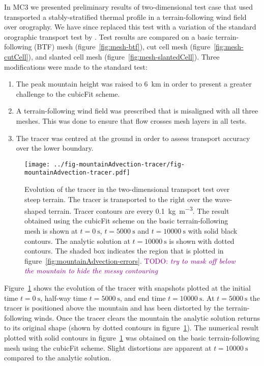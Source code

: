\documentclass[a4paper,11pt]{article}
\newcommand{\TODO}[1]{\textcolor{purple}{TODO: \emph{#1}}}
\begin{document}
In MC3 we presented preliminary results of two-dimensional test case that used transported a stably-stratified thermal profile in a terrain-following wind field over orography.  We have since replaced this test with a variation of the standard orographic transport test by \citet{schaer2002}.  Test results are compared on a basic terrain-following (BTF) mesh (figure~\ref{fig:mesh-btf}), cut cell mesh (figure~\ref{fig:mesh-cutCell}), and slanted cell mesh (figure~\ref{fig:mesh-slantedCell}).  Three modifications were made to the standard test:
\begin{enumerate}
	\item The peak mountain height was raised to \SI{6}{\kilo\meter} in order to present a greater challenge to the cubicFit scheme.
	\item A terrain-following wind field was prescribed that is misaligned with all three meshes.  This was done to ensure that flow crosses mesh layers in all tests.
	\item The tracer was centred at the ground in order to assess transport accuracy over the lower boundary.
\end{enumerate}

\begin{figure}
	\centering
	\texttt{[image: ../fig-mountainAdvection-tracer/fig-mountainAdvection-tracer.pdf]}
	\caption{Evolution of the tracer in the two-dimensional transport test over steep terrain.  The tracer is transported to the right over the wave-shaped terrain.  Tracer contours are every \SI{0.1}{\kilo\gram\per\meter\cubed}.  The result obtained using the cubicFit scheme on the basic terrain-following mesh is shown at $t=\SI{0}{\second}$, $t=\SI{5000}{\second}$ and $t=\SI{10000}{\second}$ with solid black contours. The analytic solution at $t=\SI{10000}{\second}$ is shown with dotted contours.
	The shaded box indicates the region that is plotted in figure~\ref{fig:mountainAdvection-errors}.
	\TODO{try to mask off below the mountain to hide the messy contouring}}
	\label{fig:mountainAdvection-tracer}
\end{figure}

Figure~\ref{fig:mountainAdvection-tracer} shows the evolution of the tracer with snapshots plotted at the initial time $t = \SI{0}{\second}$, half-way time $t = \SI{5000}{\second}$, and end time $t= \SI{10000}{\second}$.  At $t = \SI{5000}{\second}$ the tracer is positioned above the mountain and has been distorted by the terrain-following winds.  Once the tracer clears the mountain the analytic solution returns to its original shape (shown by dotted contours in figure~\ref{fig:mountainAdvection-tracer}).  The numerical result plotted with solid contours in figure~\ref{fig:mountainAdvection-tracer} was obtained on the basic terrain-following mesh using the cubicFit scheme.  Slight distortions are apparent at $t = \SI{10000}{\second}$ compared to the analytic solution.
\end{document}
